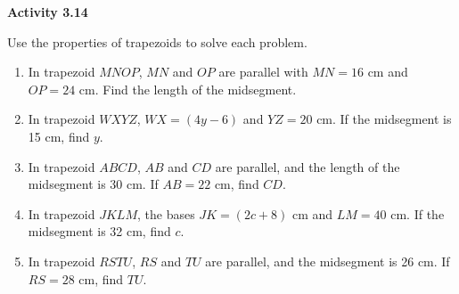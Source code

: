 \vspace{0.3ex}
\noindent\textbf{Activity 3.14}

\vspace{0.2ex}

Use the properties of trapezoids to solve each problem.

\begin{enumerate}[label=\color{blue}\arabic*.]
    \item In trapezoid \(MNOP\), \(MN\) and \(OP\) are parallel with \(MN = 16\) cm and \(OP = 24\) cm. Find the length of the midsegment.
    \item In trapezoid \(WXYZ\), \(WX = (4y - 6)\) and \(YZ = 20\) cm. If the midsegment is 15 cm, find \(y\).
    \item In trapezoid \(ABCD\), \(AB\) and \(CD\) are parallel, and the length of the midsegment is 30 cm. If \(AB = 22\) cm, find \(CD\).
    \item In trapezoid \(JKLM\), the bases \(JK = (2c + 8)\) cm and \(LM = 40\) cm. If the midsegment is 32 cm, find \(c\).
    \item In trapezoid \(RSTU\), \(RS\) and \(TU\) are parallel, and the midsegment is 26 cm. If \(RS = 28\) cm, find \(TU\).
\end{enumerate}
